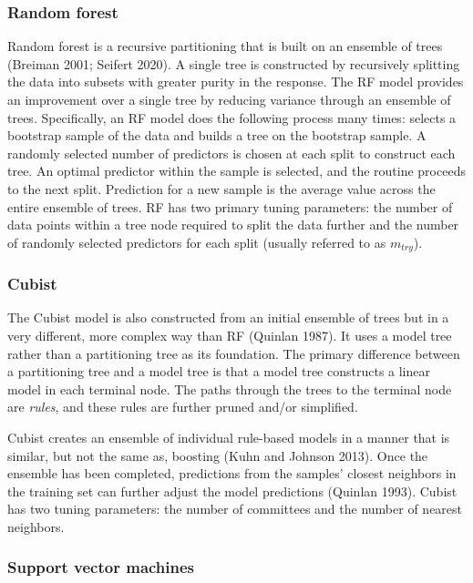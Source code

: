 \documentclass[
  letterpaper,
  DIV=11,
  numbers=noendperiod]{scrartcl}
\begin{document}
\hypertarget{random-forest}{%
\subsubsection{Random forest}\label{random-forest}}

Random forest is a recursive partitioning that is built on an ensemble
of trees (Breiman 2001; Seifert 2020). A single tree is constructed by
recursively splitting the data into subsets with greater purity in the
response. The RF model provides an improvement over a single tree by
reducing variance through an ensemble of trees. Specifically, an RF
model does the following process many times: selects a bootstrap sample
of the data and builds a tree on the bootstrap sample. A randomly
selected number of predictors is chosen at each split to construct each
tree. An optimal predictor within the sample is selected, and the
routine proceeds to the next split. Prediction for a new sample is the
average value across the entire ensemble of trees. RF has two primary
tuning parameters: the number of data points within a tree node required
to split the data further and the number of randomly selected predictors
for each split (usually referred to as \(m_{try}\)).

\hypertarget{cubist}{%
\subsubsection{Cubist}\label{cubist}}

The Cubist model is also constructed from an initial ensemble of trees
but in a very different, more complex way than RF (Quinlan 1987). It
uses a model tree rather than a partitioning tree as its foundation. The
primary difference between a partitioning tree and a model tree is that
a model tree constructs a linear model in each terminal node. The paths
through the trees to the terminal node are \emph{rules}, and these rules
are further pruned and/or simplified.

Cubist creates an ensemble of individual rule-based models in a manner
that is similar, but not the same as, boosting (Kuhn and Johnson 2013).
Once the ensemble has been completed, predictions from the samples'
closest neighbors in the training set can further adjust the model
predictions (Quinlan 1993). Cubist has two tuning parameters: the number
of committees and the number of nearest neighbors.

\hypertarget{support-vector-machines}{%
\subsubsection{Support vector machines}\label{support-vector-machines}}
\end{document}
